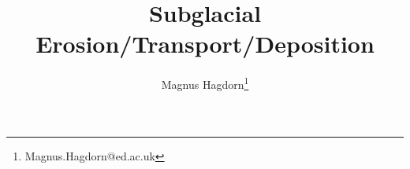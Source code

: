 \newcommand{\dir}{erosion}

\pagestyle{myheadings}


\title{Subglacial Erosion/Transport/Deposition}
\author{Magnus Hagdorn\thanks{Magnus.Hagdorn@ed.ac.uk}}
\maketitle
\tableofcontents
\newpage



